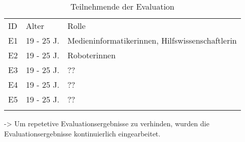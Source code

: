 \begin{table}[h]
    \centering
    \caption{Teilnehmende der Evaluation}
    \begin{tabular}{lll}
            \arrayrulecolor{maincolor}\hline
            \sffamily\color{maincolor}ID & \sffamily\color{maincolor}Alter &
            \sffamily\color{maincolor}Rolle \\
            \arrayrulecolor{maincolor}\hline
            E1                           & 19 - 25 J.                      &
            Medieninformatikerinnen, Hilfswissenschaftlerin                        \\
            E2                           & 19 - 25 J.                      & Roboterinnen \\
            E3                           & 19 - 25 J.                      & ??         \\
            E4                           & 19 - 25 J.                      & ??         \\
            E5                          & 19 - 25 J.                      & ?? \\
            \arrayrulecolor{maincolor}\hline
    \end{tabular}
    \label{table:e}
\end{table}







-> Um repetetive Evaluationsergebnisse zu verhinden, wurden die
Evaluationsergebnisse kontinuierlich eingearbeitet.